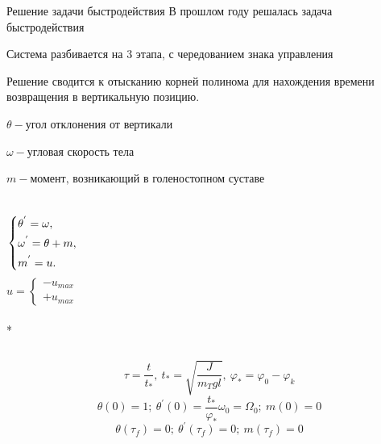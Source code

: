 \documentclass[10pt]{beamer}
\begin{document}
\begin{frame}{Решение задачи быстродействия}
	В прошлом году решалась задача быстродействия

	Система разбивается на 3 этапа, с чередованием знака управления

	Решение сводится к отысканию корней полинома для нахождения времени возвращения в вертикальную позицию.

	$\theta - \text{угол отклонения от вертикали}$

	$\omega - \text{угловая скорость тела}$

	$m - \text{момент, возникающий в голеностопном суставе}$


	\begin{columns}
		\begin{equation}\label{basesystem}
			\left\{ {\begin{aligned}
						 & \theta^{'} = \omega , \hfill   \\
						 & \omega^{'} = \theta+m , \hfill \\
						 & m^{'} = u . \hfill             \\
					\end{aligned}} \right.
		\end{equation}
		\[
			u=
			\begin{cases}
				-u_{max} \\
				+u_{max}
			\end{cases}
		\]\\*
	\end{columns}
	
\[
    \tau=\frac{t}{t_\ast},\ t_\ast=\sqrt{\frac{J}{m_Tgl}},\ \varphi_\ast=\varphi_0-\varphi_k
\]
	\[
		\theta(0)=1;\ \theta^{'}(0)=\frac{t_\ast}{\varphi_\ast}\omega_0=\Omega_0;\ m(0)=0
	\]
	\[
		\theta(\tau_f)=0;\ \theta^{'}(\tau_f)=0;\ m(\tau_f)=0
	\]
\end{frame}
\end{document}
